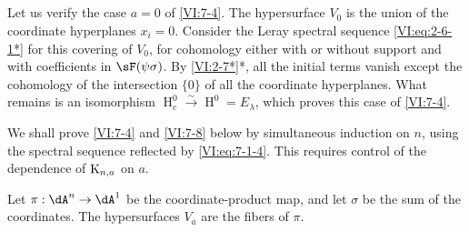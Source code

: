 \documentclass[12pt,oneside,english]{smfbook}
\DeclareMathOperator{\h}{H}
\newcommand{\iso}{\xrightarrow\sim}
\newcommand{\kloos}{\textnormal{K}} %
\begin{document}
\subsection{}\label{VI:7-7}

Let us verify the case $a=0$ of \ref{VI:7-4}. The hypersurface $V_0$ is the union of the coordinate hyperplanes $x_i=0$. Consider the Leray spectral sequence \eqref{VI:eq:2-6-1*} for this covering of $V_0$, for cohomology either with or without support and with coefficients in $\sF(\psi\sigma)$. By \ref{VI:2-7*}*, all the initial terms vanish except the cohomology of the intersection $\{0\}$ of all the coordinate hyperplanes. What remains is an isomorphism $\h_c^0\iso\h^0=E_\lambda$, which proves this case of \ref{VI:7-4}.

We shall prove \ref{VI:7-4} and \ref{VI:7-8} below by simultaneous induction on $n$, using the spectral sequence reflected by \eqref{VI:eq:7-1-4}. This requires control of the dependence of $\kloos_{n,a}$ on $a$.

Let $\pi:\dA^n\to\dA^1$ be the coordinate-product map, and let $\sigma$ be the sum of the coordinates. The hypersurfaces $V_a$ are the fibers of $\pi$.
\end{document}
